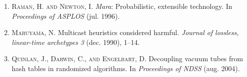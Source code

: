 \documentclass[12pt, twocolumn]{article}
\begin{document}
\begin{footnotesize}
\begin{enumerate}
\item \textsc{Raman, H. and Newton, I.} {\em Mara}: Probabilistic, extensible technology. In \emph{Proceedings of ASPLOS} (jul. 1996).


\item \textsc{Maruyama, N.} Multicast heuristics considered harmful. \emph{Journal of lossless, linear-time archetypes 3} (dec. 1990), 1--14.


\item \textsc{Quinlan, J., Darwin, C., and Engelbart, D.} Decoupling vacuum tubes from hash tables in randomized algorithms. In \emph{Proceedings of NDSS} (aug. 2004).


\end{enumerate}
\end{footnotesize}
\end{document}
